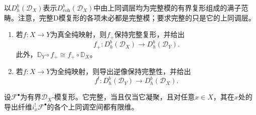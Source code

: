 以$D_h^b(\mathcal D_X)$表示$D_{\mathrm{coh}}^b(\mathcal D_X)$中由上同调层均为完整模的有界复形组成的满子范畴。注意，完整D模复形的各项未必都是完整模；要求完整的只是它的上同调层。
\begin{proposition}\label{L14S2O8}
\begin{enumerate}[label=(\arabic*)]
\item 若$f:X\to Y$为真全纯映射，则$f_+$保持完整复形，并给出
\[f_+:D_h^b(\mathcal D_X)\to D_h^b(\mathcal D_Y).\]
此外，$\mathbb D_Y\circ f_+\cong f_+\circ\mathbb D_X$。
\item 若$f:X\to Y$为全纯映射，则导出逆像保持完整性，并给出
\[f^!:D_h^b(\mathcal D_Y)\to D_h^b(\mathcal D_X).\]

\end{enumerate}
\end{proposition}
\begin{theorem}\label{L14S2O9}
设$\mathcal F^\bullet$为有界$\mathcal D_X$-模复形。它完整，当且仅当它凝聚，且对任意$x\in X$，其在$x$处的导出纤维$i_x^!\mathcal F^\bullet$的各个上同调空间都有限维。
\end{theorem}
